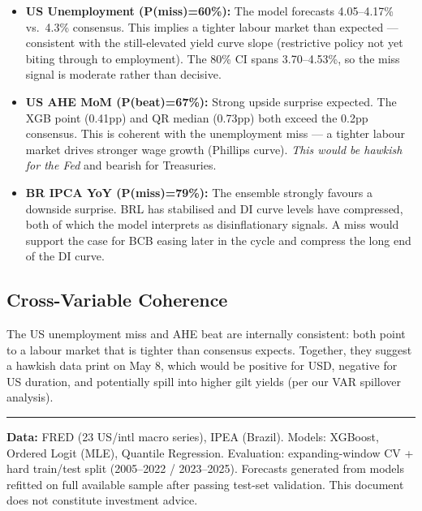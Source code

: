 \documentclass[11pt,a4paper]{article}
\begin{document}
\begin{itemize}[nosep, leftmargin=1.2em]
    \item \textbf{US Unemployment (P(miss)=60\%):} The model forecasts 4.05--4.17\% vs.\ 4.3\% consensus. This implies a tighter labour market than expected --- consistent with the still-elevated yield curve slope (restrictive policy not yet biting through to employment). The 80\% CI spans 3.70--4.53\%, so the miss signal is moderate rather than decisive.
    \item \textbf{US AHE MoM (P(beat)=67\%):} Strong upside surprise expected. The XGB point (0.41pp) and QR median (0.73pp) both exceed the 0.2pp consensus. This is coherent with the unemployment miss --- a tighter labour market drives stronger wage growth (Phillips curve). \textit{This would be hawkish for the Fed} and bearish for Treasuries.
    \item \textbf{BR IPCA YoY (P(miss)=79\%):} The ensemble strongly favours a downside surprise. BRL has stabilised and DI curve levels have compressed, both of which the model interprets as disinflationary signals. A miss would support the case for BCB easing later in the cycle and compress the long end of the DI curve.
\end{itemize}

\subsection*{Cross-Variable Coherence}
The US unemployment miss and AHE beat are internally consistent: both point to a labour market that is tighter than consensus expects. Together, they suggest a hawkish data print on May 8, which would be positive for USD, negative for US duration, and potentially spill into higher gilt yields (per our VAR spillover analysis).

\vspace{0.3cm}
\noindent\rule{\textwidth}{0.4pt}
{\footnotesize\color{biggrey} \textbf{Data:} FRED (23 US/intl macro series), IPEA (Brazil). Models: XGBoost, Ordered Logit (MLE), Quantile Regression. Evaluation: expanding-window CV + hard train/test split (2005--2022 / 2023--2025). Forecasts generated from models refitted on full available sample after passing test-set validation. This document does not constitute investment advice.}
\end{document}
